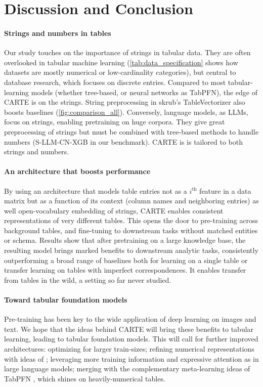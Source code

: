 \documentclass{article}
\theoremstyle{plain}
\theoremstyle{definition}
\theoremstyle{remark}
\begin{document}
\section{Discussion and Conclusion}

\paragraph{Strings and numbers in tables}

Our study touches on the importance of strings in tabular data. They are often overlooked in tabular machine learning (\autoref{tab:data_specification} shows how datasets are mostly numerical or low-cardinality categories), but central to database research, which focuses on discrete entries. Compared to most tabular-learning models (whether tree-based, or neural networks as TabPFN), the edge of CARTE is on the strings. String preprocessing in skrub's TableVectorizer also boosts baselines (\autoref{fig:comparison_all}).
Conversely, language models, as LLMs, focus on strings, enabling pretraining on huge corpora. They give great preprocessing of strings but must be combined with tree-based methods to handle numbers (S-LLM-CN-XGB in our benchmark). CARTE is is tailored to both strings and numbers.

\paragraph{An architecture that boosts performance} 

By using an architecture that models table entries not as a $i^\text{th}$ feature in a data matrix but as a function of its context (column names and neighboring entries) as well open-vocabulary embedding of strings, CARTE enables consistent representations of very different tables. This opens the door to pre-training across background tables, and fine-tuning to downstream tasks without matched entities or schema. Results show that after pretraining on a large knowledge base, the resulting model brings marked benefits to downstream analytic tasks, consistently outperforming a broad range of baselines both for learning on a single table or transfer learning on tables with imperfect correspondences.
It enables transfer from tables in the wild, a setting so far never studied.

\paragraph{Toward tabular foundation models}
Pre-training has been key to the wide application of deep learning on images and text. We hope that the ideas behind CARTE will bring these benefits to tabular learning, leading to tabular foundation models.
This will call for further improved architectures: optimizing for larger train-sizes; refining numerical representations with ideas of \citet{gorishniy2022embeddings}; leveraging more training information and expressive attention as in large language models; merging with the complementary meta-learning ideas of TabPFN \citep{hollmannTabPFNTransformerThat2023}, which shines on heavily-numerical tables.
\end{document}
